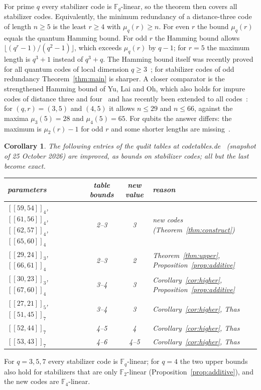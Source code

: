 \documentclass[11pt]{amsart}
\newtheorem{corollary}[theorem]{Corollary}
\theoremstyle{definition}
\theoremstyle{remark}
\newcommand{\F}{\mathbb F}
\newcommand{\qq}[1]{[\![#1]\!]}
\begin{document}
For prime $q$ every stabilizer code is $\F_q$-linear, so the theorem then covers all stabilizer codes. Equivalently, the minimum redundancy of a distance-three code of length $n\ge5$ is the least $r\ge4$ with $\mu_q(r)\ge n$. For even $r$ the bound $\mu_q(r)$ equals the quantum Hamming bound. For odd $r$ the Hamming bound allows $\lfloor (q^r-1)/(q^2-1)\rfloor$, which exceeds $\mu_q(r)$ by $q-1$; for $r=5$ the maximum length is $q^3+1$ instead of $q^3+q$. The Hamming bound itself was recently proved for all quantum codes of local dimension $q\ge3$~\cite{ZhangChen2026}; for stabilizer codes of odd redundancy Theorem~\ref{thm:main} is sharper. A closer comparator is the strengthened Hamming bound of Yu, Lai and Oh, which also holds for impure codes of distance three and four~\cite[Theorem~2(ii)]{YuLaiOh2010} and has recently been extended to all codes~\cite{GrishinZabokritskiy2026}: for $(q,r)=(3,5)$ and $(4,5)$ it allows $n\le29$ and $n\le66$, against the maxima $\mu_3(5)=28$ and $\mu_4(5)=65$. For qubits the answer differs: the maximum is $\mu_2(r)-1$ for odd $r$ and some shorter lengths are missing~\cite{YuEtAl2013}.

\begin{corollary}\label{cor:tables}
The following entries of the qudit tables at codetables.de~\cite{codetables} (snapshot of 25 October 2026) are improved, as bounds on stabilizer codes; all but the last become exact.
\begin{center}\small
\begin{tabular}{lccl}
\toprule
parameters & table bounds & new value & reason\\
\midrule
$\qq{59,54}_4$, $\qq{61,56}_4$, $\qq{62,57}_4$, $\qq{65,60}_4$ & 2--3 & 3 & new codes (Theorem~\ref{thm:construct})\\
$\qq{29,24}_3$, $\qq{66,61}_4$ & 2--3 & 2 & Theorem~\ref{thm:upper}, Proposition~\ref{prop:additive}\\
$\qq{30,23}_3$, $\qq{67,60}_4$ & 3--4 & 3 & Corollary~\ref{cor:higher}, Proposition~\ref{prop:additive}\\
$\qq{27,21}_5$, $\qq{51,45}_7$ & 3--4 & 3 & Corollary~\ref{cor:higher}, Thas\\
$\qq{52,44}_7$ & 4--5 & 4 & Corollary~\ref{cor:higher}, Thas\\
$\qq{53,43}_7$ & 4--6 & 4--5 & Corollary~\ref{cor:higher}, Thas\\
\bottomrule
\end{tabular}
\end{center}
\end{corollary}
For $q=3,5,7$ every stabilizer code is $\F_q$-linear; for $q=4$ the two upper bounds also hold for stabilizers that are only $\F_2$-linear (Proposition~\ref{prop:additive}), and the new codes are $\F_4$-linear.
\end{document}
